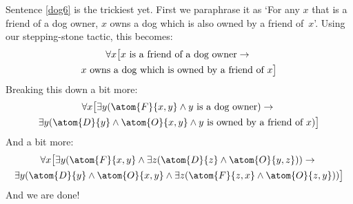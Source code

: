 Sentence \ref{dog6} is the trickiest yet. First we paraphrase it as `For any $x$ that is a friend of a dog owner, $x$ owns a dog which is also owned by a friend of~$x$'. Using our stepping-stone tactic, this becomes:
\begin{multline*}
\forall x\bigl[x\text{ is a friend of a dog owner}\rightarrow {}\\
x\text{ owns a dog which is owned by a friend of }x\bigr]
\end{multline*}
Breaking this down a bit more:
\begin{multline*}
	\forall x\bigl[\exists y(\atom{F}{x,y} \eand y\text{ is a dog owner})\eif {}\\
\exists y(\atom{D}{y} \eand \atom{O}{x,y} \eand y\text{ is owned by a friend of }x)\bigr]
\end{multline*}
And a bit more: 
\begin{multline*}
\forall x\bigl[\exists y(\atom{F}{x,y} \eand \exists z(\atom{D}{z} \eand \atom{O}{y,z})) \eif {}\\
\exists y(\atom{D}{y} \eand \atom{O}{x,y} \eand \exists z(\atom{F}{z,x} \eand \atom{O}{z,y}))\bigr]
\end{multline*}
And we are done!

